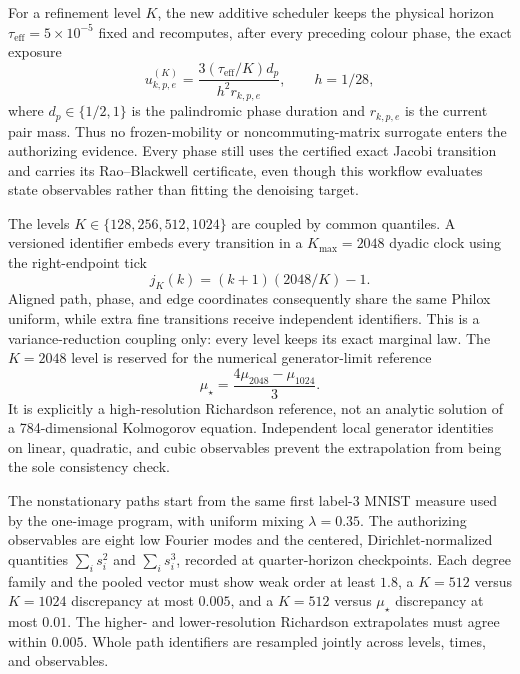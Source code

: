 \documentclass[11pt]{article}
\numberwithin{equation}{section}
\newcommand{\1}{\mathbf 1}
\begin{document}
For a refinement level $K$, the new additive scheduler keeps the physical
horizon $\tau_{\mathrm{eff}}=5\times10^{-5}$ fixed and recomputes, after
every preceding colour phase, the exact exposure
\begin{equation}
  u_{k,p,e}^{(K)}
  =
  \frac{3(\tau_{\mathrm{eff}}/K)d_p}
       {h^2 r_{k,p,e}},
  \qquad h=1/28,
  \label{eq:d0-jacobi-state-dependent-refinement-exposure}
\end{equation}
where $d_p\in\{1/2,1\}$ is the palindromic phase duration and
$r_{k,p,e}$ is the current pair mass.  Thus no frozen-mobility or
noncommuting-matrix surrogate enters the authorizing evidence.  Every phase
still uses the certified exact Jacobi transition and carries its
Rao--Blackwell certificate, even though this workflow evaluates state
observables rather than fitting the denoising target.

The levels $K\in\{128,256,512,1024\}$ are coupled by common quantiles.  A
versioned identifier embeds every transition in a $K_{\max}=2048$ dyadic
clock using the right-endpoint tick
\[
  j_K(k)=(k+1)(2048/K)-1.
\]
Aligned path, phase, and edge coordinates consequently share the same
Philox uniform, while extra fine transitions receive independent
identifiers.  This is a variance-reduction coupling only: every level keeps
its exact marginal law.  The $K=2048$ level is reserved for the numerical
generator-limit reference
\begin{equation}
  \mu_\star=\frac{4\mu_{2048}-\mu_{1024}}{3}.
  \label{eq:d0-jacobi-richardson-reference}
\end{equation}
It is explicitly a high-resolution Richardson reference, not an analytic
solution of a 784-dimensional Kolmogorov equation.  Independent local
generator identities on linear, quadratic, and cubic observables prevent
the extrapolation from being the sole consistency check.

The nonstationary paths start from the same first label-3 MNIST measure used
by the one-image program, with uniform mixing $\lambda=0.35$.  The
authorizing observables are eight low Fourier modes and the centered,
Dirichlet-normalized quantities $\sum_i s_i^2$ and $\sum_i s_i^3$, recorded
at quarter-horizon checkpoints.  Each degree family and the pooled vector
must show weak order at least $1.8$, a $K=512$ versus $K=1024$ discrepancy
at most $0.005$, and a $K=512$ versus $\mu_\star$ discrepancy at most
$0.01$.  The higher- and lower-resolution Richardson extrapolates must
agree within $0.005$.  Whole path identifiers are resampled jointly across
levels, times, and observables.
\end{document}
